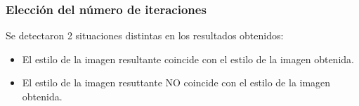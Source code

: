 \documentclass[10pt,center]{beamer}
\begin{document}
\begin{frame}
\begin{figure}
\begin{center}
\begin{tabularx}{\textwidth}{@{}cXX@{}}
      \end{tabularx}
      \end{center}

    \end{figure}
\end{frame}

\begin{frame}
  \frametitle{Elección del número de iteraciones}
  Se detectaron 2 situaciones distintas en los resultados obtenidos:
  \begin{itemize}
    \item El estilo de la imagen resultante coincide con el estilo de la imagen obtenida.
    \item El estilo de la imagen resuttante NO coincide con el estilo de la imagen obtenida.
  \end{itemize}

\end{frame}
\end{document}
